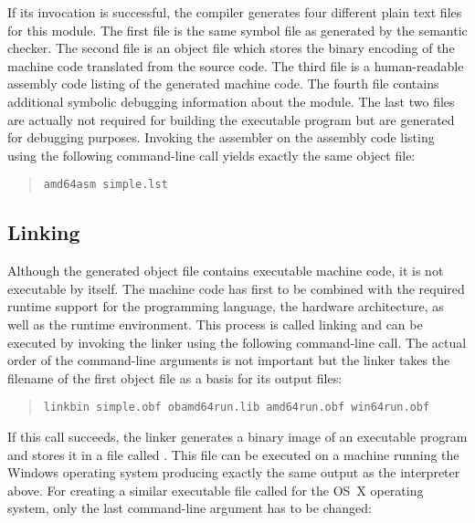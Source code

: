 If its invocation is successful, the compiler generates four different plain text files for this module.
The first file  is the same symbol file as generated by the semantic checker.
The second file  is an object file which stores the binary encoding of the machine code translated from the source code.
The third file  is a human-readable assembly code listing of the generated machine code.
The fourth file  contains additional symbolic debugging information about the module.
The last two files are actually not required for building the executable program but are generated for debugging purposes.
Invoking the assembler on the assembly code listing using the following command-line call yields exactly the same object file:

\begin{quote}\begin{verbatim}
amd64asm simple.lst
\end{verbatim}\end{quote}

\subsection{Linking}

Although the generated object file contains executable machine code, it is not executable by itself.
The machine code has first to be combined with the required runtime support for the programming language, the hardware architecture, as well as the runtime environment.
This process is called linking and can be executed by invoking the linker using the following command-line call.
The actual order of the command-line arguments is not important but the linker takes the filename of the first object file as a basis for its output files:

\begin{quote}\begin{verbatim}
linkbin simple.obf obamd64run.lib amd64run.obf win64run.obf
\end{verbatim}\end{quote}

If this call succeeds, the linker generates a binary image of an executable program and stores it in a file called .
This file can be executed on a machine running the Windows operating system producing exactly the same output as the interpreter above.
For creating a similar executable file called  for the OS~X operating system, only the last command-line argument has to be changed:


